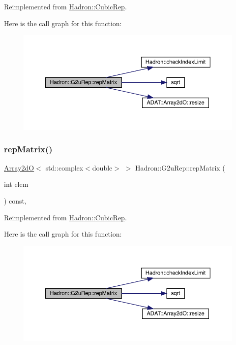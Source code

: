 Reimplemented from \mbox{\hyperlink{structHadron_1_1CubicRep_ac5d7e9e6f4ab1158b5fce3e4ad9e8005}{Hadron\+::\+Cubic\+Rep}}.

Here is the call graph for this function\+:
\nopagebreak
\begin{figure}[H]
\begin{center}
\leavevmode
\includegraphics[width=350pt]{dc/dc0/structHadron_1_1G2uRep_ac35dd43af2c4b6f32d9d3511b2500230_cgraph}
\end{center}
\end{figure}
\mbox{\label{structHadron_1_1G2uRep_ac35dd43af2c4b6f32d9d3511b2500230}} 
\subsubsection{\texorpdfstring{repMatrix()}{repMatrix()}\hspace{0.1cm}{\footnotesize\ttfamily [2/2]}}
{\footnotesize\ttfamily \mbox{\hyperlink{classADAT_1_1Array2dO}{Array2dO}}$<$ std\+::complex$<$double$>$ $>$ Hadron\+::\+G2u\+Rep\+::rep\+Matrix (\begin{DoxyParamCaption}\item[{int}]{elem }\end{DoxyParamCaption}) const\hspace{0.3cm}{\ttfamily [inline]}, {\ttfamily [virtual]}}



Reimplemented from \mbox{\hyperlink{structHadron_1_1CubicRep_ac5d7e9e6f4ab1158b5fce3e4ad9e8005}{Hadron\+::\+Cubic\+Rep}}.

Here is the call graph for this function\+:
\nopagebreak
\begin{figure}[H]
\begin{center}
\leavevmode
\includegraphics[width=350pt]{dc/dc0/structHadron_1_1G2uRep_ac35dd43af2c4b6f32d9d3511b2500230_cgraph}
\end{center}
\end{figure}


